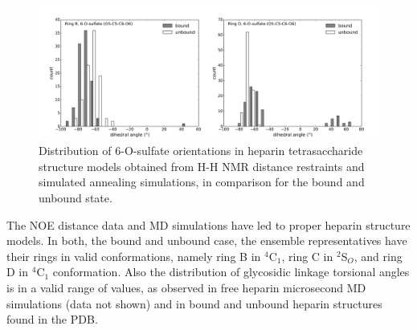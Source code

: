 \begin{figure}
\centering
\includegraphics[width=\textwidth]{gfx/nmr/SI_figure_6O_sulfate_dihedrals_B_D_01.png}
\caption[]{
Distribution of 6-O-sulfate orientations in heparin tetrasaccharide structure
models obtained from H-H NMR distance restraints and simulated annealing
simulations, in comparison for the bound and unbound state.
}
\label{fig:nmr:hp_sulfate_orientations}
\end{figure}

The NOE distance data and MD simulations have led to proper heparin structure
models. In both, the bound and unbound case, the ensemble representatives have
their rings in valid conformations, namely ring B in ${}^4$C${}_1$, ring C in
${}^2$S${}_O$, and ring D in ${}^4$C${}_1$ conformation. Also the distribution
of glycosidic linkage torsional angles is in a valid range of values, as
observed in free heparin microsecond MD simulations (data not shown) and in
bound and unbound heparin structures found in the PDB.

